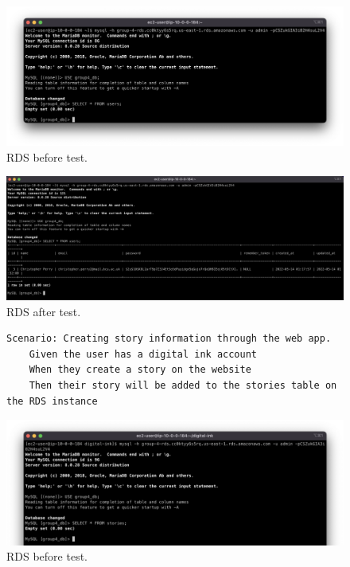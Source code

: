 \begin{figure}[!htbp]
    \centering
    \includegraphics[width=\textwidth]{resources/rds/rds-testing-empty}
    \caption{RDS before test.}
    \label{fig:rds-testing-empty}
\end{figure}

\begin{figure}[!htbp]
    \centering
    \includegraphics[width=\textwidth]{resources/rds/rds-testing-user-added}
    \caption{RDS after test.}
    \label{fig:rds-testing-user-added}
\end{figure}

\begin{figure}[!htbp]
    \centering
    \begin{verbatim}
Scenario: Creating story information through the web app.
    Given the user has a digital ink account
    When they create a story on the website
    Then their story will be added to the stories table on the RDS instance
    \end{verbatim}
    \label{fig:create-story-data}
\end{figure}

\begin{figure}[!htbp]
    \centering
    \includegraphics[width=\textwidth]{resources/rds/rds-testing-stories-before}
    \caption{RDS before test.}
    \label{fig:rds-testing-stories-empty}
\end{figure}

